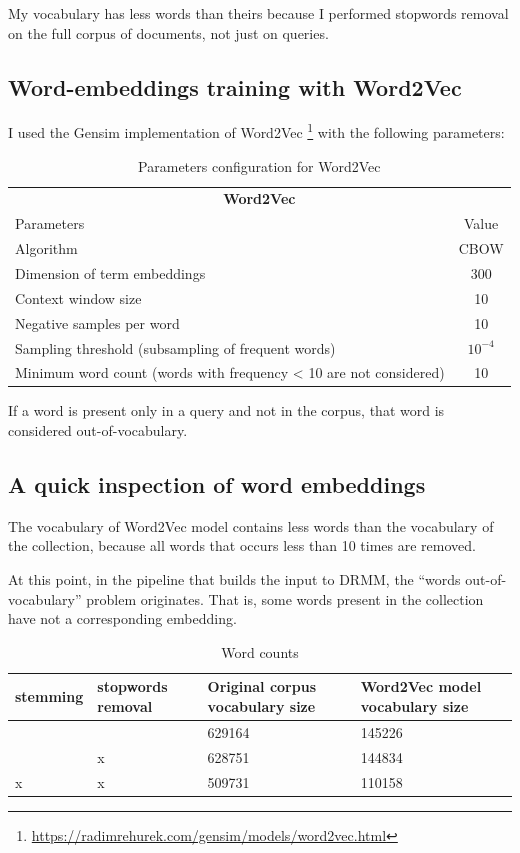 My vocabulary has less words than theirs because I performed stopwords removal on the full corpus of documents, not just on queries.

\subsection{Word-embeddings training with Word2Vec}
\label{ssec:wemb}

I used the Gensim implementation of Word2Vec \footnote{\url{https://radimrehurek.com/gensim/models/word2vec.html}} with the following parameters:

\begin{table}[H]
\centering
\begin{tabular}{p{8cm}|c}
\multicolumn{2}{c}{\textbf{Word2Vec}} \\
Parameters & Value \\ \hline
Algorithm & CBOW \\
Dimension of term embeddings & 300 \\
Context window size & 10 \\
Negative samples per word & 10 \\
Sampling threshold (subsampling of frequent words) & $10^{-4}$ \\
Minimum word count (words with frequency < 10 are not considered) & 10 \\ \hline
\end{tabular}
\caption{Parameters configuration for Word2Vec}
\label{table:w2v_config}
\end{table}

If a word is present only in a query and not in the corpus, that word is considered out-of-vocabulary.

\subsection{A quick inspection of word embeddings}

The vocabulary of Word2Vec model contains less words than the vocabulary of the collection, because all words that occurs less than 10 times are removed.

At this point, in the pipeline that builds the input to DRMM, the ``words out-of-vocabulary'' problem originates. That is, some words present in the collection have not a corresponding embedding.

\begin{table}[H]
\centering
\begin{tabular}{p{2cm}p{2cm}p{4cm}p{4cm}}
\textbf{stemming} & \textbf{stopwords removal} & \textbf{Original corpus vocabulary size} & \textbf{Word2Vec model vocabulary size} \\ \hline
& & 629164 & 145226 \\
& x & 628751 & 144834 \\
x & x & 509731 & 110158 \\
\end{tabular}
\caption{Word counts}
\end{table}


